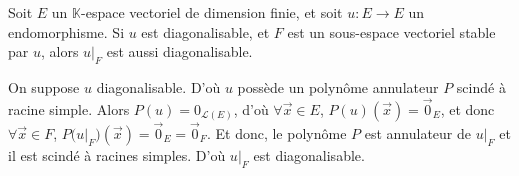\begin{prop}
	Soit $E$\/ un $\mathds{K}$-espace vectoriel de dimension finie, et soit $u : E \to E$\/ un endomorphisme. Si $u$\/ est diagonalisable, et $F$\/ est un sous-espace vectoriel stable par $u$, alors $u\big|_F$\/ est aussi diagonalisable.
\end{prop}

\begin{prv}
	On suppose $u$\/ diagonalisable.
	D'où $u$\/ possède un polynôme annulateur $P$\/ scindé à racine simple.
	Alors $P(u) = 0_{\mathscr{L}(E)}$, d'où $\forall \vec{x} \in E$, $P(u)(\vec{x}) = \vec{0}_E$, et donc $\forall \vec{x} \in F$, $P\big(u\big|_F\big)(\vec{x}) = \vec{0}_E = \vec{0}_F$.
	Et donc, le polynôme $P$\/ est annulateur de $u\big|_F$\/ et il est scindé à racines simples. D'où $u\big|_F$\/ est diagonalisable.
\end{prv}

